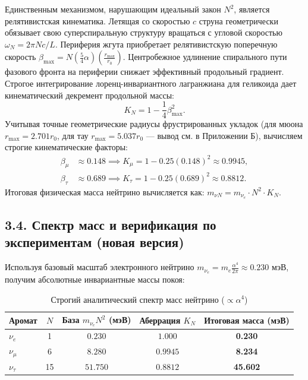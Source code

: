 \documentclass[11pt,a4paper]{article}
\begin{document}
	Единственным механизмом, нарушающим идеальный закон $N^2$, является релятивистская кинематика. Летящая со скоростью $c$ струна геометрически обязывает свою суперспиральную структуру вращаться с угловой скоростью $\omega_N = 2\pi N c / L$. Периферия жгута приобретает релятивистскую поперечную скорость $\beta_{\text{max}} = N (\frac{5}{4}\alpha) (\frac{r_{\text{max}}}{r_0})$. 
	Центробежное удлинение спирального пути фазового фронта на периферии снижает эффективный продольный градиент. Строгое интегрирование лоренц-инвариантного лагранжиана для геликоида дает кинематический декремент продольной массы:
	\begin{equation}
		K_N = 1 - \frac{1}{4} \beta_{\text{max}}^2.
	\end{equation}
	Учитывая точные геометрические радиусы фрустрированных укладок (для мюона $r_{\text{max}} = 2.701 r_0$, для тау $r_{\text{max}} = 5.037 r_0$ — вывод см. в Приложении Б), вычисляем строгие кинематические факторы:
	\begin{align}
		\beta_\mu &\approx 0.148 \implies K_\mu = 1 - 0.25(0.148)^2 \approx \mathbf{0.9945}, \\
		\beta_\tau &\approx 0.689 \implies K_\tau = 1 - 0.25(0.689)^2 \approx \mathbf{0.8812}.
	\end{align}
	Итоговая физическая масса нейтрино вычисляется как: $m_{\nu N} = m_{\nu_e} \cdot N^2 \cdot K_N$.
	
	\subsection{3.4. Спектр масс и верификация по экспериментам (новая версия)}
	Используя базовый масштаб электронного нейтрино $m_{\nu_e} = m_e \frac{\alpha^4}{2\pi} \approx 0.230$ мэВ, получим абсолютные инвариантные массы покоя:
	
	\begin{table}[h]
		\centering
		\caption{Строгий аналитический спектр масс нейтрино ($\propto \alpha^4$)}
		\renewcommand{\arraystretch}{1.3}
		\begin{tabular}{lcccc}
			\toprule
			Аромат & $N$ & База $m_{\nu_e} N^2$ (мэВ) & Аберрация $K_N$ & Итоговая масса (мэВ) \\
			\midrule
			$\nu_e$   & 1  & $0.230$  & $1.000$ & \textbf{0.230} \\
			$\nu_\mu$ & 6  & $8.280$  & $0.9945$ & \textbf{8.234} \\
			$\nu_\tau$ & 15 & $51.750$ & $0.8812$ & \textbf{45.602} \\
			\bottomrule
		\end{tabular}
	\end{table}
	
\end{document}
